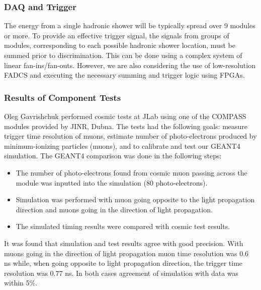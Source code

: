 \documentclass[11pt]{article}
\begin{document}
{\subsubsection{DAQ and Trigger}
\label{sec:DAQ}
The energy from a single hadronic shower will be typically spread over 9 modules or more.  To provide an effective trigger signal, the signals from groups of modules, corresponding to each possible hadronic shower location, must be summed prior to discrimination.   This can be done using a complex system of linear fan-ins/fan-outs.  However, we are also considering the use of low-resolution FADCS and executing the necessary summing and trigger logic using FPGAs.

\subsubsection{Results of Component Tests}
\label{sec:Tests}

Oleg Gavrishchuk performed cosmic tests at JLab using one of the COMPASS modules provided by JINR, Dubna.
The tests had the following goals: measure trigger time resolution of muons, 
estimate number of photo-electrons produced by minimum-ionizing particles (muons), and to calibrate and test our GEANT4 simulation. 
The GEANT4 comparison was done in the following steps:

\begin{itemize}

\item { The number of photo-electrons found from cosmic muon passing across the module was inputted into the simulation (80 photo-electrons). }
\item { Simulation was performed with muon going opposite to the light propagation direction 
        and muons going in the direction of light propagation. } 
\item { The simulated timing results were compared with cosmic test results. }

\end{itemize}
It was found that simulation and test results agree with good precision. 
With muons going in the direction of light propagation muon time resolution was 
0.6 ns while, when going opposite to light propagation direction, the trigger time resolution was 0.77 ns. 
In both cases agreement of simulation with data was within 5\%. 

}
\end{document}
